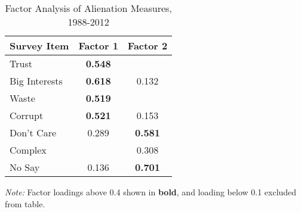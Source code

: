 \begin{table}[ht!]
\caption{Factor Analysis of Alienation Measures, 1988-2012}\vspace{-1em}
\begin{center}
\label{tab:fa-8812}
\begin{threeparttable}
\begin{tabular}{lcc}
\hline
Survey Item   & Factor 1    	  		    & Factor 2       \\ \hline
Trust         & \textbf{0.548}          &  				 \\
Big Interests & \textbf{0.618}          & 0.132 			 \\
Waste         & \textbf{0.519}          &  				 \\
Corrupt 	  & \textbf{0.521}          & 0.153 			 \\
Don't Care    & 0.289 					& \textbf{0.581} \\
Complex       &           				& 0.308			 \\
No Say        & 0.136 					& \textbf{0.701}	 \\
\hline
\end{tabular}
\begin{tablenotes}[flushleft]
\linespread{1}
	\scriptsize
	\item \textit{Note:} Factor loadings above 0.4 shown in \textbf{bold}, and loading below 0.1 excluded from table.
\end{tablenotes}
\end{threeparttable}
\end{center}
\end{table}